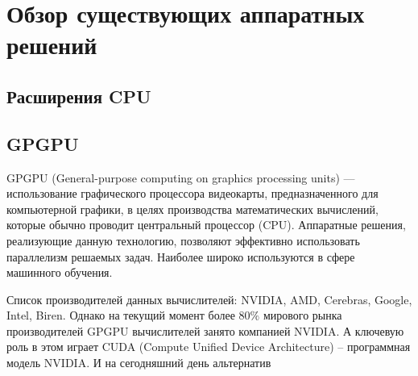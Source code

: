 \documentclass[a4paper,12pt]{article}
\begin{document}
\setlength{\parskip}{5mm}

\begin{center}
\end{center}

\section{Обзор существующих аппаратных решений}

\subsection{Расширения CPU}

\subsection{GPGPU}

GPGPU (General-purpose computing on graphics processing units) — использование графического процессора видеокарты, предназначенного для компьютерной графики, в целях производства математических вычислений, которые обычно проводит центральный процессор (CPU). Аппаратные решения, реализующие данную технологию, позволяют эффективно использовать параллелизм решаемых задач. Наиболее широко используются в сфере машинного обучения.

Список производителей данных вычислителей: NVIDIA, AMD, Cerebras, Google, Intel, Biren. Однако на текущий момент более $80\%$ мирового рынка производителей GPGPU вычислителей занято компанией NVIDIA. А ключевую роль в этом играет CUDA (Compute Unified Device Architecture) -- программная модель NVIDIA. И на сегодняшний день альтернатив
\end{document}
